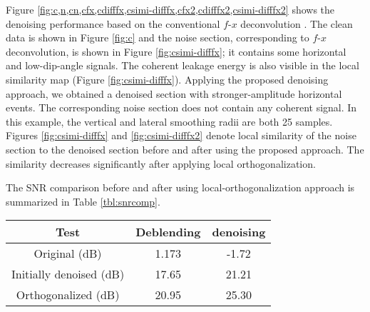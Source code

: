 Figure \ref{fig:c,n,cn,cfx,cdifffx,csimi-difffx,cfx2,cdifffx2,csimi-difffx2} shows the denoising performance based on the conventional $f$-$x$ deconvolution \cite[]{canales}. The clean data is shown in Figure \ref{fig:c} and the noise section, corresponding to $f$-$x$ deconvolution, is shown in Figure \ref{fig:csimi-difffx}; it contains some horizontal and low-dip-angle signals. The coherent leakage energy is also visible in the local similarity map (Figure \ref{fig:csimi-difffx}). Applying the proposed denoising approach, we obtained a denoised section with stronger-amplitude horizontal events. The corresponding noise section does not contain any coherent signal. In this example, the vertical and lateral smoothing radii are both 25 samples. Figures \ref{fig:csimi-difffx} and \ref{fig:csimi-difffx2} denote local similarity of the noise section to the denoised section before and after using the proposed approach. The similarity decreases significantly after applying local orthogonalization.

The SNR comparison before and after using local-orthogonalization approach is summarized in Table \ref{tbl:snrcomp}.

 {
    \begin{center}
     \begin{tabular}{|c|c|c|} 
	  \hline Test & Deblending  &  denoising			       		 \\ 
	  \hline Original (dB) & 1.173 & -1.72 \\
      \hline Initially denoised (dB)& 	17.65 & 21.21		       		 \\ 
      \hline Orthogonalized (dB)  & 20.95  & 25.30  		\\
      \hline
    \end{tabular} 
   \end{center}
} 



